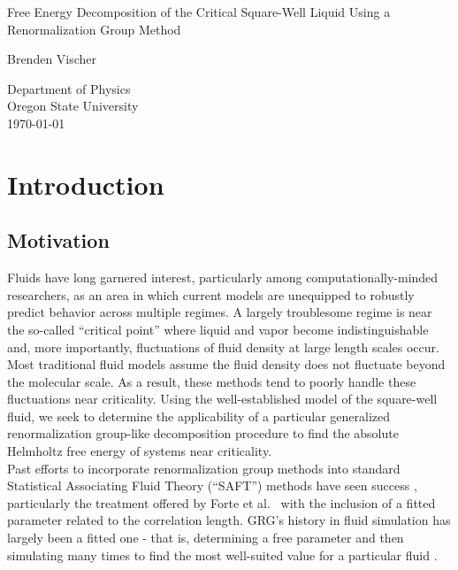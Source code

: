\documentclass[12pt]{article}
\title
\author \\
\newcommand{\ignore}[1]{}
\renewcommand{\title}{Free Energy Decomposition of the Critical Square-Well Liquid Using a Renormalization Group Method}
\renewcommand{\author}{Brenden Vischer}
\renewcommand{\titlepage}{
    {\centering
        \vspace*{4cm}
        
        \title
        
        \vspace{1.5cm}
        
        \author \\
        \text{Advisor: David Roundy}
        
        \vfill
        
        Department of Physics\\
        Oregon State University\\
        \today 
        \newpage}       
}
\begin{document}
\titlepage





\tableofcontents
\listoffigures





\section{Introduction}
\subsection{Motivation}
Fluids have long garnered interest\cite{theorysimpleliquids}\cite{theoryofcrits}, particularly among computationally-minded researchers, as an area in which current models are unequipped to robustly predict behavior across multiple regimes. A largely troublesome \cite{white2001global} regime is near the so-called ``critical point'' where liquid and vapor become indistinguishable and, more importantly, fluctuations of fluid density at large length scales occur. Most traditional fluid models assume the fluid density does not fluctuate beyond the molecular scale. As a result, these methods tend to poorly handle these fluctuations near criticality. Using the well-established model of the square-well fluid, we seek to determine the applicability of a particular generalized renormalization group-like decomposition procedure to find the absolute Helmholtz free energy of systems near criticality.\\

Past efforts to incorporate renormalization group methods into standard Statistical Associating Fluid Theory (``SAFT'') methods have seen success \cite{white2001global}, particularly the treatment offered by Forte et al.~\cite{forte2011application} with the inclusion of a fitted parameter related to the correlation length. GRG's history in fluid simulation has largely been a fitted one - that is, determining a free parameter and then simulating many times to find the most well-suited value for a particular fluid \ignore{[!fixme not quite]}.\\
\end{document}
